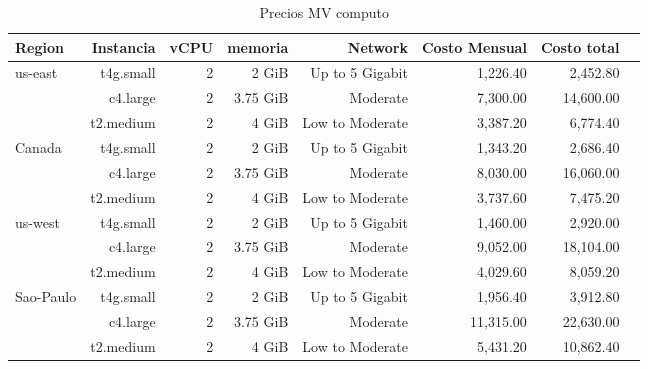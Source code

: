 \documentclass{article}
\begin{document}
\begin{table}[!htp]\centering

  \caption{Precios MV computo}\label{tab: }
  \scriptsize
  \begin{tabular}{lrrrrrrr}\toprule

  Region &Instancia &vCPU &memoria &Network &Costo Mensual &Costo total \\\midrule
  \multirow{3}{*}{us-east} &t4g.small &2 &2 GiB &Up to 5 Gigabit &1,226.40 &2,452.80 \\
  &c4.large &2 &3.75 GiB &Moderate &7,300.00 &14,600.00 \\
  &t2.medium &2 &4 GiB &Low to Moderate &3,387.20 &6,774.40 \\
  \midrule
  \multirow{3}{*}{Canada} &t4g.small &2 &2 GiB &Up to 5 Gigabit &1,343.20 &2,686.40 \\
  &c4.large &2 &3.75 GiB &Moderate &8,030.00 &16,060.00 \\
  &t2.medium &2 &4 GiB &Low to Moderate &3,737.60 &7,475.20 \\
  \midrule
  \multirow{3}{*}{us-west} &t4g.small &2 &2 GiB &Up to 5 Gigabit &1,460.00 &2,920.00 \\
  &c4.large &2 &3.75 GiB &Moderate &9,052.00 &18,104.00 \\
  &t2.medium &2 &4 GiB &Low to Moderate &4,029.60 &8,059.20 \\
  \midrule
  \multirow{3}{*}{Sao-Paulo} &t4g.small &2 &2 GiB &Up to 5 Gigabit &1,956.40 &3,912.80 \\
  &c4.large &2 &3.75 GiB &Moderate &11,315.00 &22,630.00 \\
  &t2.medium &2 &4 GiB &Low to Moderate &5,431.20 &10,862.40 \\
  \bottomrule

  \end{tabular}
\end{table}
    
\end{document}
